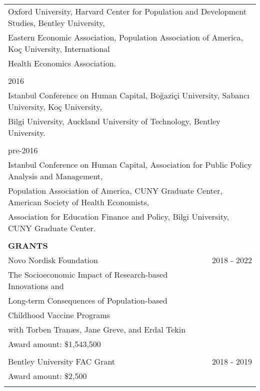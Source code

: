 \documentclass[12 pt]{article}
\begin{document}
\begin{longtable}{ccccc}
 \multicolumn{5}{l}{Oxford University, Harvard Center for Population and Development Studies, Bentley University,  }\\
  \multicolumn{5}{l}{Eastern Economic Association, Population Association of America,  Ko\c{c} University, International}\\
    \multicolumn{5}{l}{Health Economics Association.}\\
  \\ 

   
   \multicolumn{5}{l}{2016}\\

 \multicolumn{5}{l}{Istanbul Conference on Human Capital,  Bo\u{g}azi\c{c}i University, Sabanc{\i} University, Ko\c{c} University, }  \\
\multicolumn{5}{l}{ Bilgi University, Auckland University of Technology, Bentley University. }  \\
\\

   \multicolumn{5}{l}{pre-2016}\\

\multicolumn{5}{l}{Istanbul Conference on Human Capital, Association for Public Policy Analysis and Management,}  \\
\multicolumn{5}{l}{Population Association of America, CUNY Graduate Center, American Society of Health Economists,}      \\
\multicolumn{5}{l}{Association for Education Finance and Policy, Bilgi University, CUNY Graduate Center.}
 \\
 \\

 \multicolumn{5}{l}{\textbf{GRANTS}}\\[2 pt]

 \multicolumn{4}{l}{Novo Nordisk Foundation} & \multicolumn{1}{c}{2018 - 2022} \\
\multicolumn{4}{l}{The Socioeconomic Impact of Research-based Innovations and }  \\
  \multicolumn{4}{l}{Long-term Consequences of Population-based} \\
  \multicolumn{4}{l}{Childhood Vaccine Programs }  \\
  \multicolumn{4}{l}{with Torben Tran{\ae}s, Jane Greve, and Erdal Tekin}  \\
  \multicolumn{4}{l}{Award amount: \$1,543,500 }  \\
  \\

 \multicolumn{4}{l}{Bentley University FAC Grant} & \multicolumn{1}{c}{2018 - 2019} \\
\multicolumn{4}{l}{Award amount: \$2,500}  \\
\\


\end{longtable}
\end{document}
